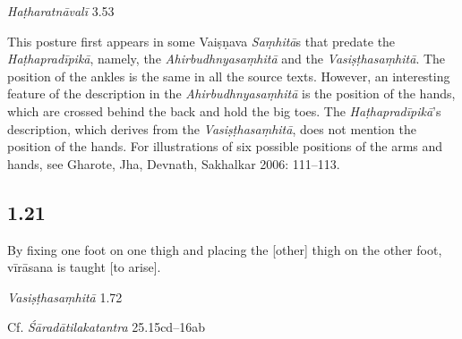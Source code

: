\begin{ekdosis}
\begin{testimonia}[hp01_020]
\emph{Haṭharatnāvalī} 3.53

\begin{versinnote}
\end{versinnote}

\end{testimonia}

\begin{philcomm}[hp01_020]        
This posture first appears in some Vaiṣṇava \emph{Saṃhitā}s that predate the \emph{Haṭhapradīpikā}, namely, the \emph{Ahirbudhnyasaṃhitā} and the \emph{Vasiṣṭhasaṃhitā}. The position of the ankles is the same in all the source texts. However, an interesting feature of the description in the \emph{Ahirbudhnyasaṃhitā} is the position of the hands, which are crossed behind the back and hold the big toes. The \emph{Haṭhapradīpikā}’s description, which derives from the \emph{Vasiṣṭhasaṃhitā}, does not mention the position of the hands. For illustrations of six possible positions of the arms and hands, see Gharote, Jha, Devnath, Sakhalkar 2006: 111–113.
\end{philcomm}

\subsection*{1.21}
\begin{translation}[hp01_021]
By fixing one foot on one thigh and placing the [other] thigh on the other foot, vīrāsana is taught [to arise].
\end{translation}

\begin{sources}[hp01_021]
\emph{Vasiṣṭhasaṃhitā} 1.72

\begin{versinnote}
\end{versinnote}

Cf. \emph{Śāradātilakatantra} 25.15cd–16ab

\begin{versinnote}
\end{versinnote}


\end{sources}
\end{ekdosis}
